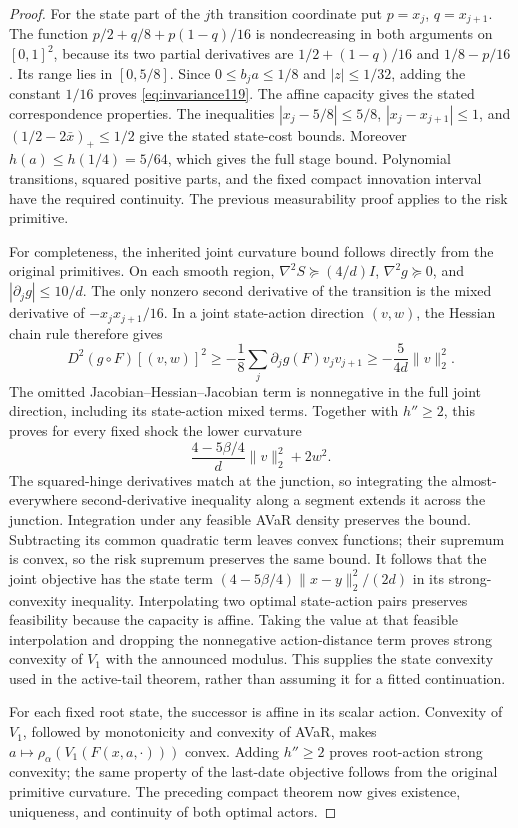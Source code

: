 \begin{proof}
For the state part of the $j$th transition coordinate put
$p=x_j$, $q=x_{j+1}$.  The function
$p/2+q/8+p(1-q)/16$ is nondecreasing in both arguments on
$[0,1]^2$, because its two partial derivatives are
$1/2+(1-q)/16$ and $1/8-p/16$.  Its range lies in $[0,5/8]$.
Since $0\le b_ja\le1/8$ and $|z|\le1/32$, adding the
constant $1/16$ proves \eqref{eq:invariance119}.  The affine
capacity gives the stated correspondence properties.  The inequalities
$|x_j-5/8|\le5/8$, $|x_j-x_{j+1}|\le1$, and
$(1/2-2\bar x)_+\le1/2$ give the stated state-cost bounds.
Moreover $h(a)\le h(1/4)=5/64$, which gives the full stage
bound.  Polynomial transitions, squared positive parts, and the fixed
compact innovation interval have the required continuity.  The
previous measurability proof applies to the risk primitive.

For completeness, the inherited joint curvature bound follows directly
from the original primitives.  On each smooth region,
$\nabla^2S\succeq(4/d)I$, $\nabla^2g\succeq0$, and
$|\partial_jg|\le10/d$.  The only nonzero second derivative
of the transition is the mixed derivative of
$-x_jx_{j+1}/16$.  In a joint state-action direction $(v,w)$,
the Hessian chain rule therefore gives
\[
 D^2(g\circ F)[(v,w)]^2
 \ge-\frac18\sum_j\partial_jg(F)v_jv_{j+1}
 \ge-\frac5{4d}\|v\|_2^2.
\]
The omitted Jacobian--Hessian--Jacobian term is nonnegative in
the full joint direction, including its state-action mixed terms.
Together with $h''\ge2$, this proves for every fixed shock
the lower curvature
\[
 \frac{4-5\beta/4}{d}\|v\|_2^2+2w^2.
\]
The squared-hinge derivatives match at the junction, so integrating
the almost-everywhere second-derivative inequality along a segment
extends it across the junction.  Integration under any feasible
AVaR density preserves the bound.  Subtracting its common quadratic
term leaves convex functions; their supremum is convex, so the risk
supremum preserves the same bound.  It follows that the joint
objective has the state term
$(4-5\beta/4)\|x-y\|_2^2/(2d)$ in its strong-convexity
inequality.  Interpolating two optimal state-action pairs preserves
feasibility because the capacity is affine.  Taking the value at that
feasible interpolation and dropping the nonnegative action-distance
term proves strong convexity of $V_1$ with the announced modulus.
This supplies the state convexity used in the active-tail theorem,
rather than assuming it for a fitted continuation.

For each fixed root state, the successor is affine in its scalar
action.  Convexity of $V_1$, followed by monotonicity and convexity
of AVaR, makes $a\mapsto\rho_\alpha(V_1(F(x,a,\cdot)))$
convex.  Adding $h''\ge2$ proves root-action strong convexity;
the same property of the last-date objective follows from the
original primitive curvature.  The preceding compact theorem now
gives existence, uniqueness, and continuity of both optimal actors.


\end{proof}
